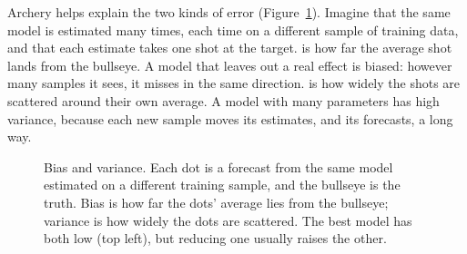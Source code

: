 Archery helps explain the two kinds of error (Figure~\ref{fig:20-targets}). Imagine that the same model is estimated many times, each time on a different sample of training data, and that each estimate takes one shot at the target.  is how far the average shot lands from the bullseye. A model that leaves out a real effect is biased: however many samples it sees, it misses in the same direction.  is how widely the shots are scattered around their own average. A model with many parameters has high variance, because each new sample moves its estimates, and its forecasts, a long way.

\begin{figure}[htbp]
  \centering
  \caption{Bias and variance. Each dot is a forecast from the same model
    estimated on a different training sample, and the bullseye is the truth.
    Bias is how far the dots' average lies from the bullseye; variance is how
    widely the dots are scattered. The best model has both low (top left), but
    reducing one usually raises the other.}
  \label{fig:20-targets}
\end{figure}

